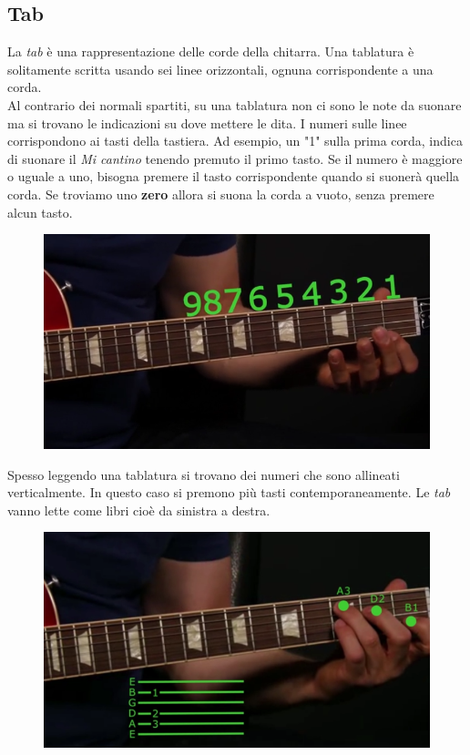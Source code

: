 \subsection{Tab}
La \textit{tab} è una rappresentazione delle corde della chitarra. Una tablatura è solitamente scritta usando sei linee orizzontali, ognuna corrispondente a una corda.\\
Al contrario dei normali spartiti, su una tablatura non ci sono le note da suonare ma si trovano le indicazioni su dove mettere le dita. I numeri sulle linee corrispondono ai tasti della tastiera. Ad esempio, un "1" sulla prima corda, indica di suonare il \textit{Mi cantino} tenendo premuto il primo tasto.
Se il numero è maggiore o uguale a uno, bisogna premere il tasto corrispondente quando si suonerà quella corda. Se troviamo uno \textbf{zero} allora si suona la corda a vuoto, senza premere alcun tasto.
\begin{figure}[H]
	\centering
	\includegraphics[scale=0.50]{./images/img15.png}
\end{figure}

Spesso leggendo una tablatura si trovano dei numeri che sono allineati verticalmente. In questo caso si premono più tasti contemporaneamente. Le \textit{tab} vanno lette come libri cioè da sinistra a destra.
\begin{figure}[H]
	\centering
	\includegraphics[scale=0.50]{./images/img16.png}
\end{figure}